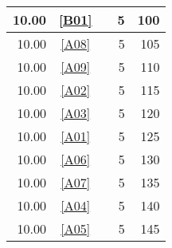 \begin{longtable}{|r|c|p{7cm}||r|r|}
10.00 & \ref{B01} & \nameref{B01} & 5 & 100 \\ \hline
10.00 & \ref{A08} & \nameref{A08} & 5 & 105 \\ \hline
10.00 & \ref{A09} & \nameref{A09} & 5 & 110 \\ \hline
10.00 & \ref{A02} & \nameref{A02} & 5 & 115 \\ \hline
10.00 & \ref{A03} & \nameref{A03} & 5 & 120 \\ \hline
10.00 & \ref{A01} & \nameref{A01} & 5 & 125 \\ \hline
10.00 & \ref{A06} & \nameref{A06} & 5 & 130 \\ \hline
10.00 & \ref{A07} & \nameref{A07} & 5 & 135 \\ \hline
10.00 & \ref{A04} & \nameref{A04} & 5 & 140 \\ \hline
10.00 & \ref{A05} & \nameref{A05} & 5 & 145 \\ \hline
\end{longtable}